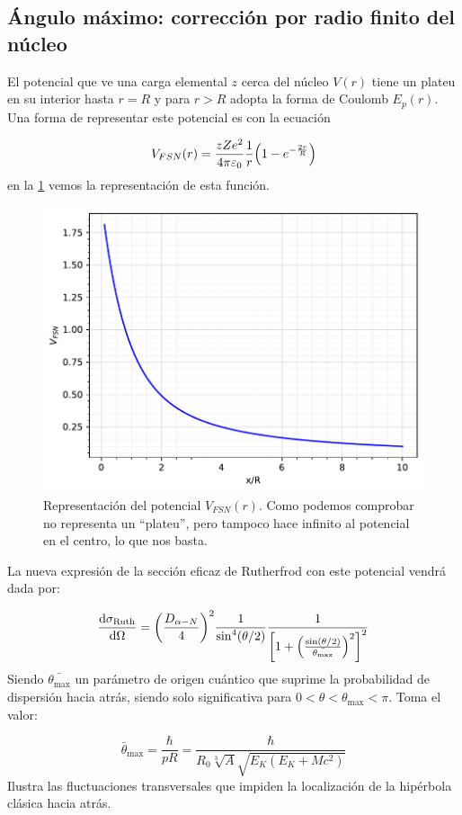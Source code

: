 \subsection{Ángulo máximo: corrección por radio finito del núcleo}

El potencial que ve una carga elemental $z$ cerca del núcleo $V(r)$ tiene un plateu en su interior hasta $r=R$ y para $r>R$ adopta la forma de Coulomb $E_p(r)$. Una forma de representar  este potencial es con la ecuación 

\begin{equation}
    V_{FSN} (r) = \frac{zZe^2}{4 \pi \varepsilon_0} \frac{1}{r} \pqty{1-e^{-\frac{2r}{R}}}
\end{equation}
en la \cref{Fig:02.01} vemos la representación de esta función. 

\begin{figure}[H] \centering
    \includegraphics[width=0.6\linewidth]{Images/Ch_02/02-Vfsn.pdf}
    \caption{Representación del potencial $V_{FSN}(r)$. Como podemos comprobar no representa un ``plateu'', pero tampoco hace infinito al potencial en el centro, lo que nos basta.}
    \label{Fig:02.01}
\end{figure}

La nueva expresión de la sección eficaz de Rutherfrod con este potencial vendrá dada por:

\begin{equation}
    \dv{\sigma_{\Ruth}}{\Omega} = \pqty{\frac{D_{\alpha-N}}{4}}^2 \frac{1}{\sin^4(\theta/2)} \frac{1}{\bqty{1+\pqty{\frac{\sin (\theta/2)}{\bar{\theta_{\max}}}}^2}^2}
\end{equation}
Siendo $\bar{\theta_{\max}}$ un parámetro de origen cuántico que suprime la probabilidad de dispersión hacia atrás, siendo solo significativa para $0<\theta<\theta_{\max}<\pi$. Toma el valor:

\begin{equation}
    \bar{\theta}_{\max} = \frac{\hbar}{p R} = \frac{\hbar }{R_0 \sqrt[3]{A} \sqrt{E_K (E_K+Mc^2)}}   \label{Ec:02-tehtamax}
\end{equation}
Ilustra las fluctuaciones transversales que impiden la localización de la hipérbola clásica hacia atrás. 


